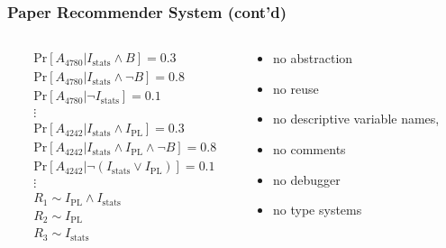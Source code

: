 \documentclass[usenames,dvipsnames]{beamer}
\begin{document}
\begin{frame}
  \frametitle{Paper Recommender System (cont'd)}
  \vspace{-0.8cm}
  \begin{columns}[t]
    \begin{column}{.48\textwidth}
      \begin{align*}
        &\text{Pr} [ A_\text{4780} | I_\text{stats} \wedge B ] = 0.3 \\
        &\text{Pr} [ A_\text{4780} | I_\text{stats} \wedge \neg B ] = 0.8 \\
        &\text{Pr} [ A_\text{4780} | \neg I_\text{stats} ] = 0.1 \\
        &\vdots \\
        &\text{Pr} [ A_\text{4242} | I_\text{stats} \wedge I_\text{PL} ] = 0.3 \\
        &\text{Pr} [ A_\text{4242} | I_\text{stats} \wedge I_\text{PL} \wedge \neg B ] = 0.8 \\
        &\text{Pr} [ A_\text{4242} | \neg (I_\text{stats} \vee I_\text{PL}) ] = 0.1 \\
        &\vdots \\
        &R_1 \sim I_\text{PL} \wedge I_\text{stats} \\
        &R_2 \sim I_\text{PL} \\
        &R_3 \sim I_\text{stats} \\
      \end{align*}
    \end{column}
    \begin{column}{.48\textwidth}
      \begin{itemize}
        \item no abstraction
        \item no reuse
        \item no descriptive variable names,
        \item no comments
        \item no debugger
        \item no type systems
      \end{itemize}
    \end{column}
  \end{columns}
\end{frame}
\end{document}
